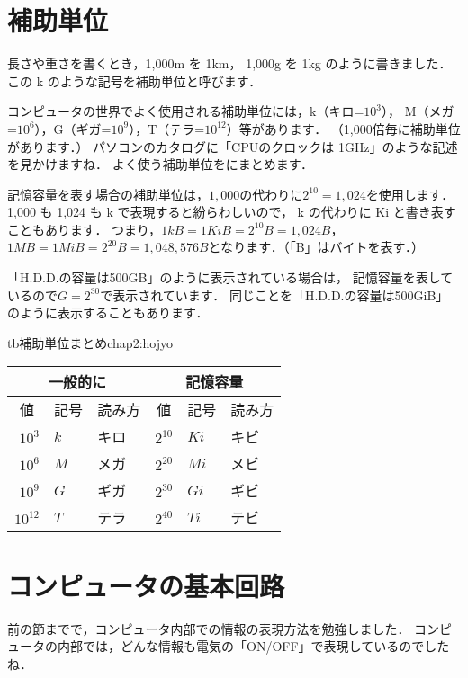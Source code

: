 \section{補助単位}

長さや重さを書くとき，1,000m を 1km， 1,000g を 1kg のように書きました．
この k のような記号を補助単位と呼びます．

コンピュータの世界でよく使用される補助単位には，k（キロ=$10^3$），
M（メガ=$10^6$），G（ギガ=$10^9$），T（テラ=$10^{12}$）等があります．
（1,000倍毎に補助単位があります．）
パソコンのカタログに「CPUのクロックは 1GHz」のような記述を見かけますね．
よく使う補助単位をにまとめます．

記憶容量を表す場合の補助単位は，$1,000$の代わりに$2^{10} = 1,024$を使用します．
1,000 も 1,024 も k で表現すると紛らわしいので，
k の代わりに Ki と書き表すこともあります．
つまり，$1kB =1KiB = 2^{10}B = 1,024B$，
$1MB =1MiB = 2^{20}B = 1,048,576B$となります．（「B」はバイトを表す．）

「H.D.D.の容量は500GB」のように表示されている場合は，
記憶容量を表しているので$G = 2^{30}$で表示されています．
同じことを「H.D.D.の容量は500GiB」のように表示することもあります．

\begin{mytable}{tb}{補助単位まとめ}{chap2:hojyo}
{\small\begin{tabular}{r l l | r l l}\hline\hline
\multicolumn{3}{c|}{一般的に} &
\multicolumn{3}{c}{記憶容量} \\
\hline
\multicolumn{1}{c}{値} &
\multicolumn{1}{c}{記号} &
\multicolumn{1}{c|}{読み方} &
\multicolumn{1}{c}{値} &
\multicolumn{1}{c}{記号} &
\multicolumn{1}{c}{読み方} \\
\hline
$10^3$   & $k$ & キロ   & $2^{10}$ & $Ki$ & キビ \\
$10^6$   & $M$ & メガ   & $2^{20}$ & $Mi$ & メビ \\
$10^9$   & $G$ & ギガ   & $2^{30}$ & $Gi$ & ギビ \\
$10^{12}$& $T$ & テラ   & $2^{40}$ & $Ti$ & テビ \\
\end{tabular}}
\end{mytable}

\section{コンピュータの基本回路}

前の節までで，コンピュータ内部での情報の表現方法を勉強しました．
コンピュータの内部では，どんな情報も電気の「ON/OFF」で表現しているのでしたね．

